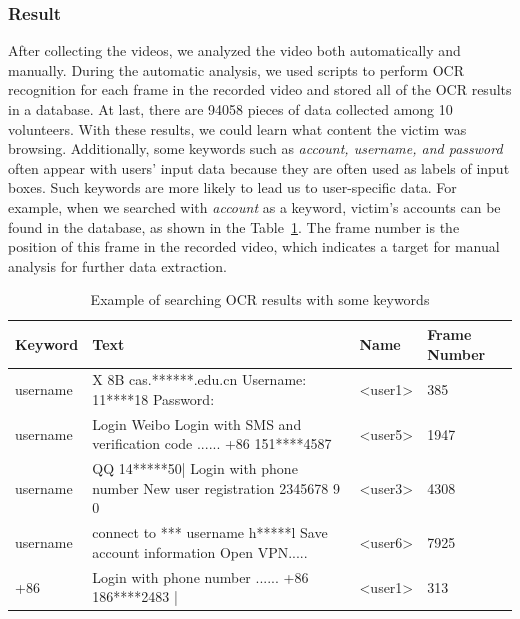 \subsubsection{Result}
After collecting the videos, we analyzed the video both automatically and manually.
During the automatic analysis, we used scripts to perform OCR recognition for each frame in the recorded video and stored all of the OCR results in a database.
At last, there are 94058 pieces of data collected among 10 volunteers.
With these results, we could learn what content the victim was browsing.
Additionally, some keywords such as \textit{account, username, and password} often appear with users' input data because they are often used as labels of input boxes.
Such keywords are more likely to lead us to user-specific data.
For example, when we searched with \textit{account} as a keyword, victim's accounts can be found in the database, as shown in the Table~\ref{tab:ocr_keyword_example}.
The frame number is the position of this frame in the recorded video, which indicates a target for manual analysis for further data extraction.

\begin{table}[t]
	\centering
	\begin{tabular}{|l|l|l|l|}
		\hline
		Keyword  & Text                                                                                                                          & Name                           & Frame Number \\ \hline
		username & X 8B cas.******.edu.cn Username: 11****18 Password:                                                                           & \textless{}user1\textgreater{} & 385          \\ \hline
		username & Login Weibo Login with SMS and verification code ...... +86 151****4587 & \textless{}user5\textgreater{} & 1947         \\ \hline
		username & QQ 14*****50| Login with phone number New user registration 2345678 9 0                                                       & \textless{}user3\textgreater{} & 4308         \\ \hline
		username & connect to *** username h*****l Save account information Open VPN.....                                                        & \textless{}user6\textgreater{} & 7925         \\ \hline
		+86      & Login with phone number ...... +86 186****2483 |                                                                              & \textless{}user1\textgreater{} & 313          \\ \hline
	\end{tabular}
	\linebreak
	\caption{Example of searching OCR results with some keywords}
	\label{tab:ocr_keyword_example}
\end{table}


